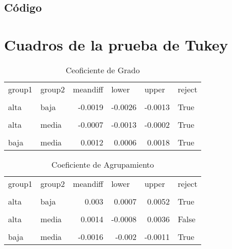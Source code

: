 \documentclass{article}
\begin{document}
\subsection{Código}



\section{Cuadros de la prueba de Tukey}

\begin{table}[htbp]
  \centering
  \caption{Ceoficiente de Grado}
    \begin{tabular}{llrrrl}
    group1 & group2 & \multicolumn{1}{l}{meandiff} & \multicolumn{1}{l}{lower} & \multicolumn{1}{l}{upper} & reject \\
          &       &       &       &       &  \\
    alta  & baja  & -0.0019 & -0.0026 & -0.0013 & True \\
          &       &       &       &       &  \\
    alta  & media & -0.0007 & -0.0013 & -0.0002 & True \\
          &       &       &       &       &  \\
    baja  & media & 0.0012 & 0.0006 & 0.0018 & True \\
    \end{tabular}%
  \label{tab:addlabel}%
\end{table}%

\begin{table}[htbp]
  \centering
  \caption{Coeficiente de Agrupamiento}
    \begin{tabular}{llrrrl}
    group1 & group2 & \multicolumn{1}{l}{meandiff} & \multicolumn{1}{l}{lower} & \multicolumn{1}{l}{upper} & reject \\
          &       &       &       &       &  \\
    alta  & baja  & 0.003 & 0.0007 & 0.0052 & True \\
          &       &       &       &       &  \\
    alta  & media & 0.0014 & -0.0008 & 0.0036 & False \\
          &       &       &       &       &  \\
    baja  & media & -0.0016 & -0.002 & -0.0011 & True \\
    \end{tabular}%
  \label{tab:addlabel}%
\end{table}%
\end{document}

